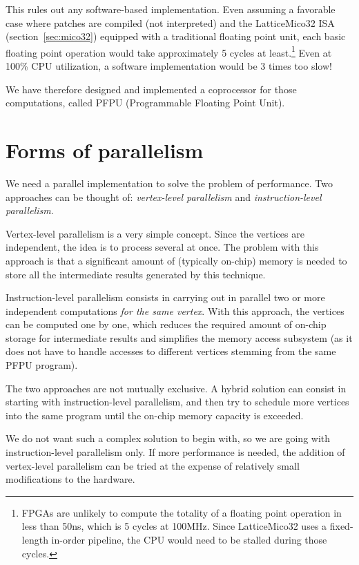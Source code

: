 \documentclass[a4paper,11pt]{kthesis}
\begin{document}
This rules out any software-based implementation. Even assuming a favorable case where patches are compiled (not interpreted) and the LatticeMico32 ISA (section~\ref{sec:mico32}) equipped with a traditional floating point unit, each basic floating point operation would take approximately 5 cycles at least.\footnote{FPGAs are unlikely to compute the totality of a floating point operation in less than 50ns, which is 5 cycles at 100MHz. Since LatticeMico32 uses a fixed-length in-order pipeline, the CPU would need to be stalled during those cycles.} Even at 100\% CPU utilization, a software implementation would be 3 times too slow!

We have therefore designed and implemented a coprocessor for those computations, called PFPU (Programmable Floating Point Unit).

\section{Forms of parallelism}
We need a parallel implementation to solve the problem of performance. Two approaches can be thought of: \textit{vertex-level parallelism} and \textit{instruction-level parallelism}.

Vertex-level parallelism is a very simple concept. Since the vertices are independent, the idea is to process several at once. The problem with this approach is that a significant amount of (typically on-chip) memory is needed to store all the intermediate results generated by this technique.

Instruction-level parallelism consists in carrying out in parallel two or more independent computations \textit{for the same vertex}. With this approach, the vertices can be computed one by one, which reduces the required amount of on-chip storage for intermediate results and simplifies the memory access subsystem (as it does not have to handle accesses to different vertices stemming from the same PFPU program).

The two approaches are not mutually exclusive. A hybrid solution can consist in starting with instruction-level parallelism, and then try to schedule more vertices into the same program until the on-chip memory capacity is exceeded.

We do not want such a complex solution to begin with, so we are going with instruction-level parallelism only. If more performance is needed, the addition of vertex-level parallelism can be tried at the expense of relatively small modifications to the hardware.
\end{document}
